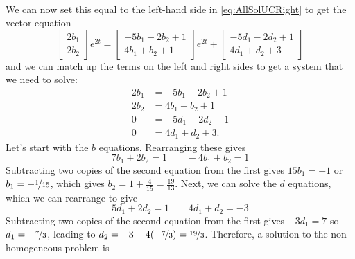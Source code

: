 \documentclass{ximera}
\begin{document}
\begin{exampleSol}
\begin{enumerate}
\begin{equation*}
\begin{split}
                \end{split}
            \end{equation*}
            We can now set this equal to the left-hand side in \eqref{eq:AllSolUCRight} to get the vector equation
            \begin{equation*}
                \begin{bmatrix} 2b_1 \\ 2b_2 \end{bmatrix} e^{2t} = \begin{bmatrix} -5b_1 - 2b_2 + 1 \\ 4b_1 + b_2 + 1 \end{bmatrix}e^{2t} + \begin{bmatrix} -5d_1 - 2d_2 + 1\\ 4d_1 + d_2 + 3 \end{bmatrix}
            \end{equation*}
            and we can match up the terms on the left and right sides to get a system that we need to solve:
            \begin{equation*}
                \begin{split}
                    2b_1 &= -5b_1 - 2b_2 + 1 \\
                    2b_2 &= 4b_1 + b_2 + 1 \\
                    0 &= -5d_1- 2d_2 + 1 \\
                    0 &= 4d_1 + d_2 + 3.
                \end{split}
            \end{equation*}
            Let's start with the $b$ equations. Rearranging these gives
            \begin{equation*}
                7b_1 + 2b_2 = 1 \qquad -4b_1 + b_2 = 1
            \end{equation*}
            Subtracting two copies of the second equation from the first gives $15b_1 = -1$ or $b_1 = -\nicefrac{1}{15}$, which gives $b_2 = 1 + \frac{4}{15} = \frac{19}{13}$. Next, we can solve the $d$ equations, which we can rearrange to give
            \begin{equation*}
                5d_1 + 2d_2 = 1 \qquad 4d_1 + d_2 = -3
            \end{equation*} 
            Subtracting two copies of the second equation from the first gives $-3d_1 = 7$ so $d_1 = -\nicefrac{7}{3}$, leading to $d_2 = -3 - 4(-\nicefrac{7}{3}) = \nicefrac{19}{3}$. Therefore, a solution to the non-homogeneous problem is
            \begin{equation*}

\end{equation*}
\end{enumerate}
\end{exampleSol}
\end{document}
